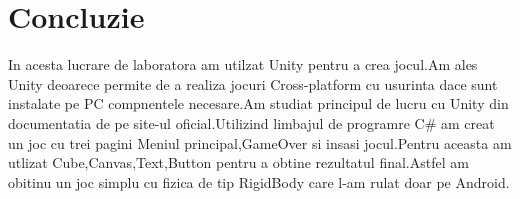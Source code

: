 \section*{Concluzie}
In acesta lucrare de laboratora am utilzat Unity pentru a crea jocul.Am ales Unity deoarece permite de a realiza jocuri Cross-platform cu usurinta dace sunt instalate pe PC compnentele necesare.Am studiat principul de lucru cu Unity din documentatia de pe site-ul oficial.Utilizind limbajul de programre C\# am creat un joc cu trei pagini Meniul principal,GameOver si insasi jocul.Pentru aceasta am utlizat Cube,Canvas,Text,Button pentru a obtine rezultatul final.Astfel am obitinu un joc simplu cu fizica de tip RigidBody care l-am rulat doar pe Android.

\clearpage